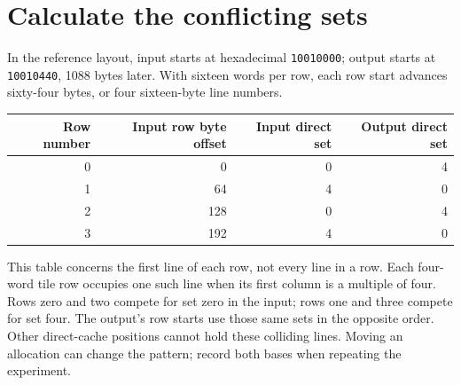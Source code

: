 \section{Calculate the conflicting sets}\label{transpose-x-sets}
In the reference layout, input starts at hexadecimal \texttt{10010000}; output
starts at \texttt{10010440}, 1088 bytes later. With sixteen words per row, each
row start advances sixty-four bytes, or four sixteen-byte line numbers.
\begin{longtable}{rrrr}
  \toprule
  Row number & Input row byte offset & Input direct set & Output direct set \\
  \midrule
  0          & 0                     & 0                & 4                 \\
  1          & 64                    & 4                & 0                 \\
  2          & 128                   & 0                & 4                 \\
  3          & 192                   & 4                & 0                 \\
  \bottomrule
\end{longtable}
This table concerns the first line of each row, not every line in a row. Each
four-word tile row occupies one such line when its first column is a multiple of
four. Rows zero and two compete for set zero in the input; rows one and three
compete for set four. The output's row starts use those same sets in the opposite
order. Other direct-cache positions cannot hold these colliding lines. Moving
an allocation can change the pattern; record both bases when repeating the
experiment.
